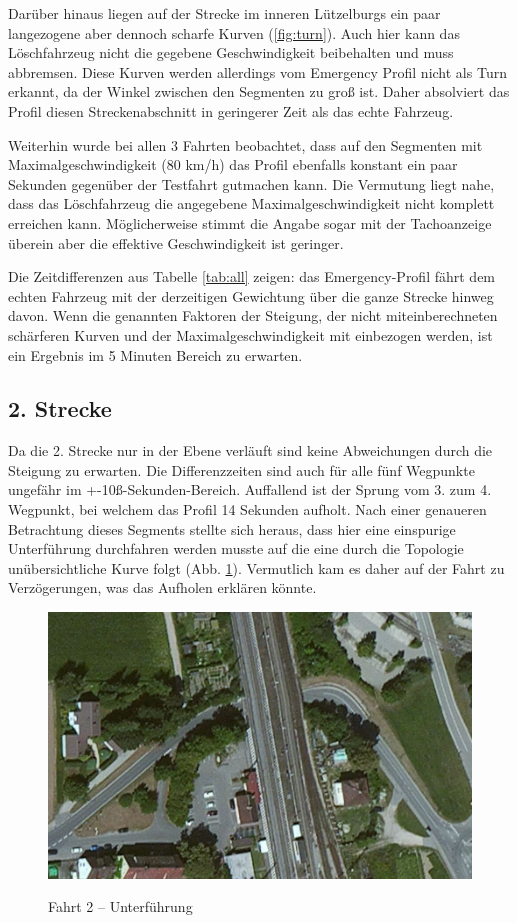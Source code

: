 \documentclass[12pt,a4paper]{article}
\begin{document}
Darüber hinaus liegen auf der Strecke im inneren Lützelburgs ein paar langezogene aber dennoch scharfe Kurven (\ref{fig:turn}). Auch hier kann das Löschfahrzeug nicht die gegebene Geschwindigkeit beibehalten und muss abbremsen. Diese Kurven werden allerdings vom Emergency Profil nicht als Turn erkannt, da der Winkel zwischen den Segmenten zu groß ist. Daher absolviert das Profil diesen Streckenabschnitt in geringerer Zeit als das echte Fahrzeug.

Weiterhin wurde bei allen 3 Fahrten beobachtet, dass auf den Segmenten mit Maximalgeschwindigkeit (80 km/h) das Profil ebenfalls konstant ein paar Sekunden gegenüber der Testfahrt gutmachen kann.
Die Vermutung liegt nahe, dass das Löschfahrzeug die angegebene Maximalgeschwindigkeit nicht komplett erreichen kann. Möglicherweise stimmt die Angabe sogar mit der Tachoanzeige überein aber die effektive Geschwindigkeit ist geringer.

Die Zeitdifferenzen aus Tabelle \ref{tab:all} zeigen: das Emergency-Profil fährt dem echten Fahrzeug mit der derzeitigen Gewichtung über die ganze Strecke hinweg davon. Wenn die genannten Faktoren der Steigung, der nicht miteinberechneten schärferen Kurven und der Maximalgeschwindigkeit mit einbezogen werden, ist ein Ergebnis im 5 Minuten Bereich zu erwarten.


\subsection{2. Strecke}

Da die 2. Strecke nur in der Ebene verläuft sind keine Abweichungen durch die Steigung zu erwarten. Die Differenzzeiten sind auch für alle fünf Wegpunkte ungefähr im +-10ß-Sekunden-Bereich. Auffallend ist der Sprung vom 3. zum 4. Wegpunkt, bei welchem das Profil 14 Sekunden aufholt. Nach einer genaueren Betrachtung dieses Segments stellte sich heraus, dass hier eine einspurige Unterführung durchfahren werden musste auf die eine durch die Topologie unübersichtliche Kurve folgt (Abb. \ref{fig:traintunnel}). Vermutlich kam es daher auf der Fahrt zu Verzögerungen, was das Aufholen erklären könnte.

\begin{figure}[h]
\centering
\caption{Fahrt 2 -- Unterführung}
\label{fig:traintunnel}
\includegraphics[width = 0.40 \textwidth]{../media/traintunnel.png} \\
\end{figure}
\end{document}
